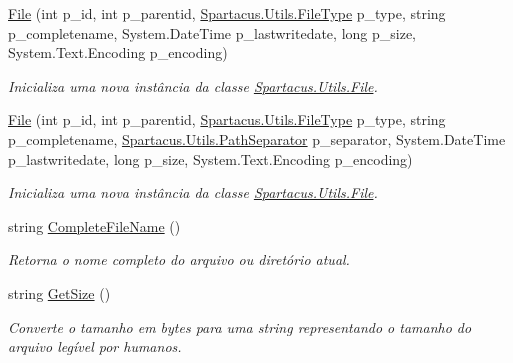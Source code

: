 \begin{DoxyCompactItemize}
\hyperlink{classSpartacus_1_1Utils_1_1File_abc4d0978855b91e7ef4dfafdb631778f}{File} (int p\+\_\+id, int p\+\_\+parentid, \hyperlink{namespaceSpartacus_1_1Utils_a2bc44488e88db523cb2dcffaa6e77541}{Spartacus.\+Utils.\+File\+Type} p\+\_\+type, string p\+\_\+completename, System.\+Date\+Time p\+\_\+lastwritedate, long p\+\_\+size, System.\+Text.\+Encoding p\+\_\+encoding)
\begin{DoxyCompactList}\small\item\em Inicializa uma nova instância da classe \hyperlink{classSpartacus_1_1Utils_1_1File}{Spartacus.\+Utils.\+File}. \end{DoxyCompactList}\item 
\hyperlink{classSpartacus_1_1Utils_1_1File_a18acaaace0997553d2d9bcd4587300df}{File} (int p\+\_\+id, int p\+\_\+parentid, \hyperlink{namespaceSpartacus_1_1Utils_a2bc44488e88db523cb2dcffaa6e77541}{Spartacus.\+Utils.\+File\+Type} p\+\_\+type, string p\+\_\+completename, \hyperlink{namespaceSpartacus_1_1Utils_a9ee24558a33d60b42674bae3eed2a094}{Spartacus.\+Utils.\+Path\+Separator} p\+\_\+separator, System.\+Date\+Time p\+\_\+lastwritedate, long p\+\_\+size, System.\+Text.\+Encoding p\+\_\+encoding)
\begin{DoxyCompactList}\small\item\em Inicializa uma nova instância da classe \hyperlink{classSpartacus_1_1Utils_1_1File}{Spartacus.\+Utils.\+File}. \end{DoxyCompactList}\item 
string \hyperlink{classSpartacus_1_1Utils_1_1File_afd5b29174d563c6e89eaffd193f8f5ba}{Complete\+File\+Name} ()
\begin{DoxyCompactList}\small\item\em Retorna o nome completo do arquivo ou diretório atual. \end{DoxyCompactList}\item 
string \hyperlink{classSpartacus_1_1Utils_1_1File_a9038c8331fbab5e85f4b6bb607775b3c}{Get\+Size} ()
\begin{DoxyCompactList}\small\item\em Converte o tamanho em bytes para uma string representando o tamanho do arquivo legível por humanos. \end{DoxyCompactList}\end{DoxyCompactItemize}
